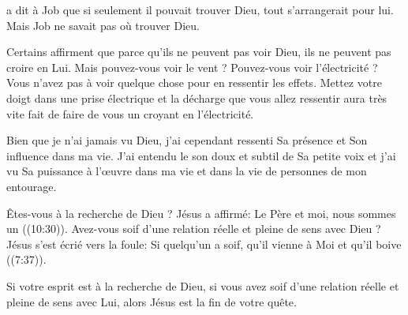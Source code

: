 


 a dit à Job que si seulement il pouvait trouver Dieu,
 tout s'arrangerait pour lui. Mais Job ne savait pas où trouver Dieu.

Certains affirment que parce qu'ils ne peuvent pas voir Dieu,
 ils ne peuvent pas croire en Lui. Mais pouvez-vous voir le vent ?
 Pouvez-vous voir l'électricité ?
 Vous n'avez pas à voir quelque chose pour en ressentir les effets.
 Mettez votre doigt dans une prise électrique et la décharge
 que vous allez ressentir aura très vite fait de faire de vous
 un \og croyant \fg{} en l'électricité.

Bien que je n'ai jamais vu Dieu, j'ai cependant ressenti Sa présence
 et Son influence dans ma vie.
 J'ai entendu le son doux et subtil de Sa petite voix
 et j'ai vu Sa puissance à l'œuvre dans ma vie
 et dans la vie de personnes de mon entourage.

Êtes-vous à la recherche de Dieu ? Jésus a affirmé\space:
 \og Le Père et moi, nous sommes un \fg{} ((10:30)).
 Avez-vous soif d'une relation réelle et pleine de sens avec Dieu ?
 Jésus s'est écrié vers la foule\space:
 \og Si quelqu'un a soif, qu'il vienne à Moi et qu'il boive \fg{}
 ((7:37)).

Si votre esprit est à la recherche de Dieu, si vous avez soif
 d'une relation réelle et pleine de sens avec Lui,
 alors Jésus est la fin de votre quête.


\dvrule







